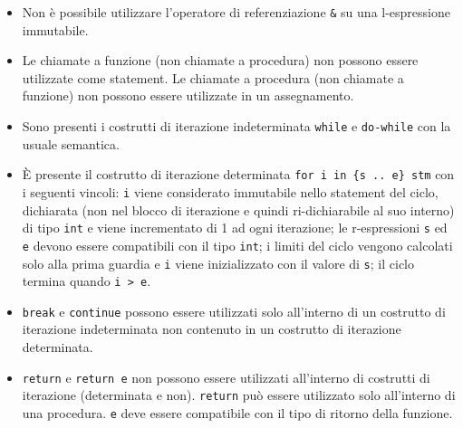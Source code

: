 \documentclass{report}
\newcommand{\term}[1]{\texttt{#1}}
\begin{document}
\begin {itemize}
\begin{itemize}
    \end{itemize}

    La dimensione di un array deve essere una r-espressione valutabile a compile-time,
    compatibile con il tipo intero e di valore positivo.

    Le costanti (\term{param}) sono considerate immutabili e definite a compile-time.
    Devono essere inizializzate solo da letterali o da r-espressioni valutabili
    a compile-time.

    Variabili e costanti sono visibili dal punto di dichiarazione fino alla fine
    del blocco, le funzioni sono visibili ovunque nel blocco di dichiarazione
    e nei blocchi al suo interno.

    Le funzioni (non procedure) devono ammettere un return in ogni path di esecuzione
    possibile.

    \item Non è possibile utilizzare l'operatore di referenziazione \term{\&} su una
    l-espressione immutabile.

    \item Le chiamate a funzione (non chiamate a procedura) non possono essere utilizzate come
    statement. Le chiamate a procedura (non chiamate a funzione) non possono essere utilizzate in un
    assegnamento.

    \item Sono presenti i costrutti di iterazione indeterminata \term{while} e
    \term{do-while} con la usuale semantica.

    \item È presente il costrutto di iterazione determinata \texttt{for i in \{s .. e\}~stm}
    con i seguenti vincoli: \texttt{i} viene considerato immutabile nello statement del ciclo,
    dichiarata (non nel blocco di iterazione e quindi ri-dichiarabile al suo interno) di tipo 
    \term{int} e viene incrementato di 1 ad  ogni iterazione; le r-espressioni \texttt{s} 
    ed \texttt{e} devono essere  compatibili con il tipo \term{int}; i limiti del ciclo 
    vengono calcolati solo alla prima guardia e \texttt{i} viene inizializzato con il 
    valore di \texttt{s}; il ciclo termina quando \texttt{i > e}.

    \item \texttt{break} e \texttt{continue} possono essere utilizzati solo all'interno
    di un costrutto di iterazione indeterminata non contenuto in un costrutto di iterazione determinata.

    \item \texttt{return} e \texttt{return e} non possono essere utilizzati all'interno
    di costrutti di iterazione (determinata e non). \texttt{return} può essere utilizzato
    solo all'interno di una procedura. \texttt{e} deve essere compatibile con
    il tipo di ritorno della funzione.


\end{itemize}
\end{document}
